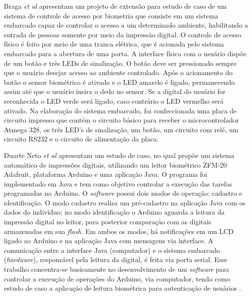 Braga \textit{et al} \cite{stephanie2014control} apresentam um projeto de extensão para estudo de caso de um sistema de controle de acesso por biometria que consiste em um sistema embarcado capaz de controlar o acesso a um determinado ambiente, habilitando a entrada de pessoas somente por meio da impressão digital. O controle de acesso físico é feito por meio de uma tranca elétrica, que é acionada pelo sistema embarcado para a abertura de uma porta. A interface física com o usuário dispõe de um botão e três LEDs de sinalização. O botão deve ser pressionado sempre que o usuário desejar acesso ao ambiente controlado. Após o acionamento do botão o sensor biométrico é ativado e o LED amarelo é ligado, permanecendo assim até que o usuário insira o dedo no sensor. Se a digital do usuário for reconhecida o LED verde será ligado, caso contrário o LED vermelho será ativado. Na elaboração do sistema embarcado, foi confeccionada uma placa de circuito impresso que contém o circuito básico para receber o microcontrolador Atmega 328, os três LED's de sinalização, um botão, um circuito com relé, um circuito RS232 e o circuito de alimentação da placa.
 


 Duarte Neto \textit{et al} \cite{neto2014sistemas} apresentam um estudo de caso, no qual propõe um sistema automático de impressões digitais, utilizando um leitor biométrico ZFM-20 Adafruit, plataforma Arduino e uma aplicação Java. O programa foi implementado em Java e tem como objetivo controlar a execução das tarefas programadas no Arduino. O \textit{software} possui dois modos de operação: cadastro e identificação. O modo cadastro realiza um pré-cadastro na aplicação Java com os dados do indivíduo; no modo identificação o Arduino aguarda a leitura da impressão digital no leitor, para posterior comparação com as digitais armazenadas em sua \textit{flash}. Em ambos os modos, há notificações em um LCD ligado ao Arduino e na aplicação Java com mensagens via interface. A comunicação entre a interface Java (computador) e o sistema embarcado (\textit{hardware}), responsável pela leitura da digital, é feita via porta serial. Esse trabalho concentra-se basicamente no desenvolvimento de um \textit{software} para controlar a execução de operações do Arduino, via computador, tendo como estudo de caso a aplicação de leitura biométrica para autenticação de usuários \cite{neto2014sistemas}.


